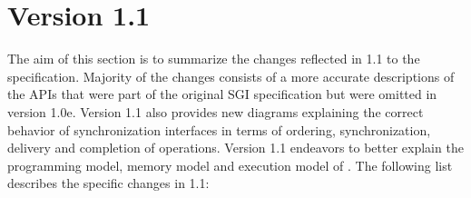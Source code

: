 \section{Version 1.1}
The aim of this section is to summarize the changes reflected in 1.1 to the \openshmem specification. 
Majority of the changes consists of a more accurate descriptions of the \openshmem \acp{API} that 
were part of the original SGI specification but were omitted in version 1.0e. Version 1.1 also provides new
diagrams explaining the correct behavior of \openshmem synchronization interfaces in terms of ordering, synchronization, delivery and completion of operations. 
Version 1.1 endeavors to better explain the programming model, memory model and execution model 
of \openshmem. The following list describes the specific changes in 1.1:

